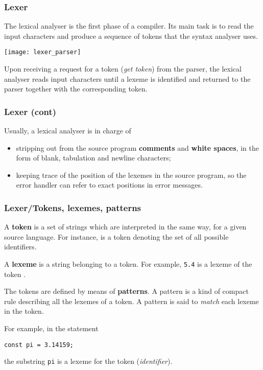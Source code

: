 
% 
\begin{frame}
\frametitle{Lexer}

The lexical analyser is the first phase of a compiler. Its main task
is to read the input characters and produce a sequence of tokens that
the syntax analyser uses.
\begin{center}
\texttt{[image: lexer\_parser]}
\end{center}
Upon receiving a request for a token (\emph{get token}) from the
parser, the lexical analyser reads input characters until a lexeme is
identified and returned to the parser together with the corresponding
token.

\end{frame}

% 
\begin{frame}
\frametitle{Lexer (cont)}

Usually, a lexical analyser is in charge of
\begin{itemize}

  \item stripping out from the source program \textbf{comments} and
  \textbf{white spaces}, in the form of blank, tabulation and newline
  characters;

  \item keeping trace of the position of the lexemes in the source
  program, so the error handler can refer to exact positions in
  error messages.

\end{itemize}

\end{frame}

% 
\begin{frame}[containsverbatim]
\frametitle{Lexer/Tokens, lexemes, patterns}

A \textbf{token} is a set of strings which are interpreted in the same
way, for a given source language. For instance,  is a
token denoting the set of all possible identifiers.

\bigskip

A \textbf{lexeme} is a string belonging to a token. For example,
\verb+5.4+ is a lexeme of the token .

\bigskip

The tokens are defined by means of \textbf{patterns}. A pattern is a
kind of compact rule describing all the lexemes of a token. A pattern
is said to \emph{match} each lexeme in the token.

\bigskip

For example, in the \Pascal statement
\begin{verbatim}
const pi = 3.14159;
\end{verbatim}
the substring \texttt{pi} is a lexeme for the token 
(\emph{identifier}).

\end{frame}


